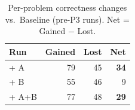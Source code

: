 \begin{table}[ht]
\centering
\caption{Per-problem correctness changes vs.\ Baseline (pre-P3 runs). Net = Gained $-$ Lost.}
\label{tab:p4-gained-lost}
\begin{tabular}{lrrr}
\toprule
Run & Gained & Lost & Net \\
\midrule
+ A & 79 & 45 & \textbf{34} \\
+ B & 55 & 46 & 9 \\
+ A+B & 77 & 48 & \textbf{29} \\
\midrule
\bottomrule
\end{tabular}
\end{table}